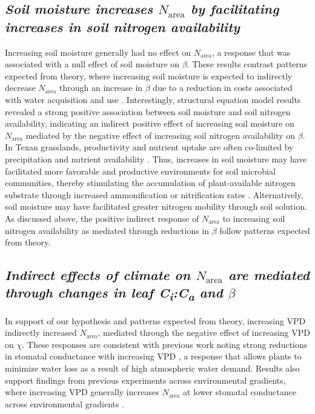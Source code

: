 \subsection{\textit{Soil moisture increases $N_\mathrm{area}$ by facilitating increases in soil nitrogen availability}}
Increasing soil moisture generally had no effect on $N_\mathrm{area}$, a response that was associated with a null effect of soil moisture on $\beta$. These results contrast patterns expected from theory, where increasing soil moisture is expected to indirectly decrease $N_\mathrm{area}$ through an increase in $\beta$ due to a reduction in costs associated with water acquisition and use . Interestingly, structural equation model results revealed a strong positive association between soil moisture and soil nitrogen availability, indicating an indirect positive effect of increasing soil moisture on $N_\mathrm{area}$ mediated by the negative effect of increasing soil nitrogen availability on $\beta$. In Texan grasslands, productivity and nutrient uptake are often co-limited by precipitation and nutrient availability . Thus, increases in soil moisture may have facilitated more favorable and productive environments for soil microbial communities, thereby stimulating the accumulation of plant-available nitrogen substrate through increased ammonification or nitrification rates . Alternatively, soil moisture may have facilitated greater nitrogen mobility through soil solution. As discussed above, the positive indirect response of $N_\mathrm{area}$ to increasing soil nitrogen availability as mediated through reductions in $\beta$ follow patterns expected from theory.

\subsection{\textit{Indirect effects of climate on $N_\mathrm{area}$ are mediated through changes in leaf C\textsubscript{i}:C\textsubscript{a} and $\beta$}}
In support of our hypothesis and patterns expected from theory, increasing VPD indirectly increased $N_\mathrm{area}$, mediated through the negative effect of increasing VPD on $\chi$. These responses are consistent with previous work noting strong reductions in stomatal conductance with increasing VPD , a response that allows plants to minimize water loss as a result of high atmospheric water demand. Results also support findings from previous experiments across environmental gradients, where increasing VPD generally increases $N_\mathrm{area}$ at lower stomatal conductance across environmental gradients .

